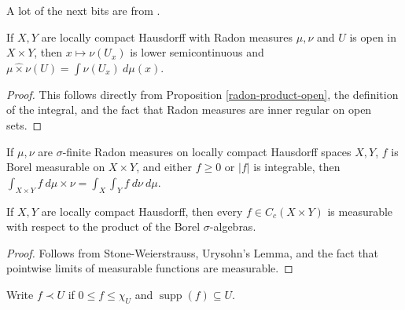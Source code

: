 \documentclass[letterpaper,11pt]{report}
\DeclareMathOperator{\supp}{supp}
\begin{document}
A lot of the next bits are from \cite{folland}.

\begin{prop} If $X,Y$ are locally compact Hausdorff with Radon measures $\mu, \nu$ and $U$ is open in $X\times Y$, then $x \mapsto \nu(U_x)$ is lower semicontinuous and $\mu{\widehat\times}\nu(U) = \int \nu(U_x)\ d\mu(x)$.
\end{prop}
\begin{proof} This follows directly from Proposition \ref{radon-product-open}, the definition of the integral, and the fact that Radon measures are inner regular on open sets.
\end{proof}

\begin{thm} If $\mu,\nu$ are $\sigma$-finite Radon measures on locally compact Hausdorff spaces $X,Y$, $f$ is Borel measurable on $X\times Y$, and either $f \ge 0$ or $|f|$ is integrable, then $\int_{X\times Y} f\ d\mu{\widehat\times}\nu = \int_X \int_Y f\ d\nu\ d\mu$.
\end{thm}

\begin{prop} If $X,Y$ are locally compact Hausdorff, then every $f \in C_c(X\times Y)$ is measurable with respect to the product of the Borel $\sigma$-algebras.
\end{prop}
\begin{proof} Follows from Stone-Weierstrauss, Urysohn's Lemma, and the fact that pointwise limits of measurable functions are measurable.%
\end{proof}

\begin{defn} Write $f \prec U$ if $0 \le f \le \chi_U$ and $\supp(f) \subseteq U$.
\end{defn}
\end{document}
